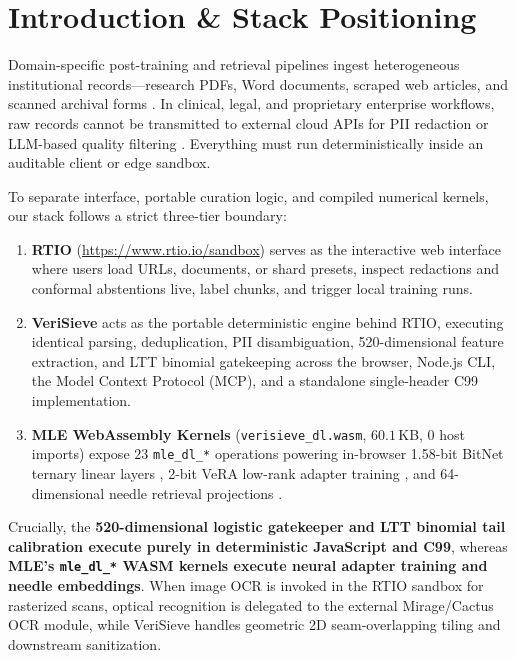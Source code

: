 \documentclass{article}
\begin{document}
\printAffiliationsAndNotice{}

\section{Introduction \& Stack Positioning}
\label{sec:intro}

Domain-specific post-training and retrieval pipelines ingest heterogeneous institutional records---research PDFs, Word documents, scraped web articles, and scanned archival forms \citep{soldaini2024dolma,penedo2024fineweb}. In clinical, legal, and proprietary enterprise workflows, raw records cannot be transmitted to external cloud APIs for PII redaction or LLM-based quality filtering \citep{ai4privacy2023,presidio2021}. Everything must run deterministically inside an auditable client or edge sandbox.

To separate interface, portable curation logic, and compiled numerical kernels, our stack follows a strict three-tier boundary:
\begin{enumerate}
    \item \textbf{RTIO} (\url{https://www.rtio.io/sandbox}) serves as the interactive web interface where users load URLs, documents, or shard presets, inspect redactions and conformal abstentions live, label chunks, and trigger local training runs.
    \item \textbf{VeriSieve} acts as the portable deterministic engine behind RTIO, executing identical parsing, deduplication, PII disambiguation, 520-dimensional feature extraction, and LTT binomial gatekeeping across the browser, Node.js CLI, the Model Context Protocol (MCP), and a standalone single-header C99 implementation.
    \item \textbf{MLE WebAssembly Kernels} (\texttt{verisieve\_dl.wasm}, $60.1$\,KB, $0$ host imports) expose $23$ \texttt{mle\_dl\_*} operations powering in-browser 1.58-bit BitNet ternary linear layers \citep{wang2024bitnet}, 2-bit VeRA low-rank adapter training \citep{kopiczko2024vera}, and 64-dimensional needle retrieval projections \citep{vaswani2017attention}.
\end{enumerate}

Crucially, the \textbf{520-dimensional logistic gatekeeper and LTT binomial tail calibration execute purely in deterministic JavaScript and C99}, whereas \textbf{MLE's \texttt{mle\_dl\_*} WASM kernels execute neural adapter training and needle embeddings}. When image OCR is invoked in the RTIO sandbox for rasterized scans, optical recognition is delegated to the external Mirage/Cactus OCR module, while VeriSieve handles geometric 2D seam-overlapping tiling and downstream sanitization.
\end{document}
